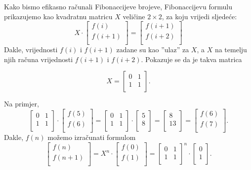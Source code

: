 \begin{samepage}
Kako bismo efikasno računali Fibonaccijeve brojeve,
Fibonaccijevu formulu
prikazujemo kao
kvadratnu matricu $X$ veličine $2 \times 2$,
za koju vrijedi sljedeće:
\[ X \cdot
 \begin{bmatrix}
  f(i) \\
  f(i+1) \\
 \end{bmatrix}
=
 \begin{bmatrix}
  f(i+1) \\
  f(i+2) \\
 \end{bmatrix}
 \]
Dakle, vrijednosti $f(i)$ i $f(i+1)$ zadane su kao
''ulaz'' za $X$,
a $X$ na temelju njih računa vrijednosti $f(i+1)$
i $f(i+2)$.
Pokazuje se da je takva matrica

\[ X = 
 \begin{bmatrix}
  0 & 1 \\
  1 & 1 \\
 \end{bmatrix}.
\]
\end{samepage}
\noindent
Na primjer,
\[
 \begin{bmatrix}
  0 & 1 \\
  1 & 1 \\
 \end{bmatrix}
\cdot
 \begin{bmatrix}
  f(5) \\
  f(6) \\
 \end{bmatrix}
=
 \begin{bmatrix}
  0 & 1 \\
  1 & 1 \\
 \end{bmatrix}
\cdot
 \begin{bmatrix}
  5 \\
  8 \\
 \end{bmatrix}
=
 \begin{bmatrix}
  8 \\
  13 \\
 \end{bmatrix}
=
 \begin{bmatrix}
  f(6) \\
  f(7) \\
 \end{bmatrix}.
\]
Dakle, $f(n)$ možemo izračunati formulom
\[
 \begin{bmatrix}
  f(n) \\
  f(n+1) \\
 \end{bmatrix}
=
X^n \cdot
 \begin{bmatrix}
  f(0) \\
  f(1) \\
 \end{bmatrix}
=
 \begin{bmatrix}
  0 & 1 \\
  1 & 1 \\
 \end{bmatrix}^n
\cdot
 \begin{bmatrix}
  0 \\
  1 \\
 \end{bmatrix}.
\]
